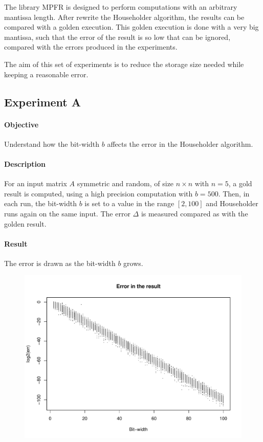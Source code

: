 \documentclass[11pt,a4paper]{article}
\begin{document}
The library MPFR is designed to perform computations with an arbitrary mantissa 
length. After rewrite the Householder algorithm, the results can be compared 
with a golden execution. This golden execution is done with a very big mantissa, 
such that the error of the result is so low that can be ignored, compared with 
the errors produced in the experiments.

The aim of this set of experiments is to reduce the storage size needed while 
keeping a reasonable error.

\newpage
\subsection*{Experiment A}

\paragraph{Objective}
Understand how the bit-width $b$ affects the error in the Householder algorithm.

\paragraph{Description}
For an input matrix $A$ symmetric and random, of size $n\times n$ with $n=5$, a 
gold result is computed, using a high precision computation with $b = 500$.  
Then, in each run, the bit-width $b$ is set to a value in the range $[2, 100]$ 
and Householder runs again on the same input.
The error $\Delta$ is measured compared as with the golden result.

\paragraph{Result}
The error is drawn as the bit-width $b$ grows.
\begin{figure}[H]
\centering
\includegraphics[width=\linewidth]{img/err.pdf}
\end{figure}
\end{document}
